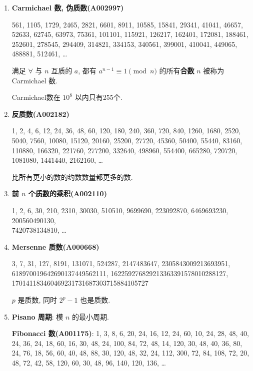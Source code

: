 \begin{enumerate}
    \item \textbf{Carmichael 数, 伪质数(A002997)}
          
          561, 1105, 1729, 2465, 2821, 6601, 8911, 10585, 15841, 29341, 41041, 46657, 52633, 62745, 63973, 75361, 101101, 115921, 126217, 162401, 172081, 188461, 252601, 278545, 294409, 314821, 334153, 340561, 399001, 410041, 449065, 488881, 512461, \dots
          
          满足 \(\forall\) 与 \(n\) 互质的 \(a\), 都有 \(a ^ {n - 1} \equiv 1 \pmod n\) 的所有\textbf{合数} \(n\) 被称为 Carmichael 数.
          
          Carmichael数在 \(10^8\) 以内只有255个.
          
    \item \textbf{反质数(A002182)}
          
          1, 2, 4, 6, 12, 24, 36, 48, 60, 120, 180, 240, 360, 720, 840, 1260, 1680, 2520, 5040, 7560, 10080, 15120, 20160, 25200, 27720, 45360, 50400, 55440, 83160, 110880, 166320, 221760, 277200, 332640, 498960, 554400, 665280, 720720, 1081080, 1441440, 2162160, \dots
          
          比所有更小的数的约数数量都更多的数.
          
    \item \textbf{前 \(n\) 个质数的乘积(A002110)}
          
          1, 2, 6, 30, 210, 2310, 30030, 510510, 9699690, 223092870, 6469693230, 200560490130,\\7420738134810, \dots
          
    \item \textbf{Mersenne 质数(A000668)}
          
          3, 7, 31, 127, 8191, 131071, 524287, 2147483647, 2305843009213693951,\\618970019642690137449562111, 162259276829213363391578010288127,\\170141183460469231731687303715884105727
          
          \(p\) 是质数, 同时 \(2^p - 1\) 也是质数.
          
    \item \textbf{Pisano 周期}: 模 \(n\) 的最小周期.
          
          \textbf{Fibonacci 数(A001175)}: 1, 3, 8, 6, 20, 24, 16, 12, 24, 60, 10, 24, 28, 48, 40, 24, 36, 24, 18, 60, 16, 30, 48, 24, 100, 84, 72, 48, 14, 120, 30, 48, 40, 36, 80, 24, 76, 18, 56, 60, 40, 48, 88, 30, 120, 48, 32, 24, 112, 300, 72, 84, 108, 72, 20, 48, 72, 42, 58, 120, 60, 30, 48, 96, 140, 120, 136, \dots
          

\end{enumerate}
